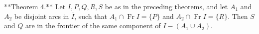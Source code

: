 **Theorem 4.** Let $I, P, Q, R, S$ be as in the preceding theorems, and let $A_1$ and $A_2$ be disjoint arcs in $\overline{I}$, such that $A_1 \cap \operatorname{Fr} I = \{P\}$ and $A_2 \cap \operatorname{Fr} I = \{R\}$. Then $S$ and $Q$ are in the frontier of the same component of $I - (A_1 \cup A_2)$.
